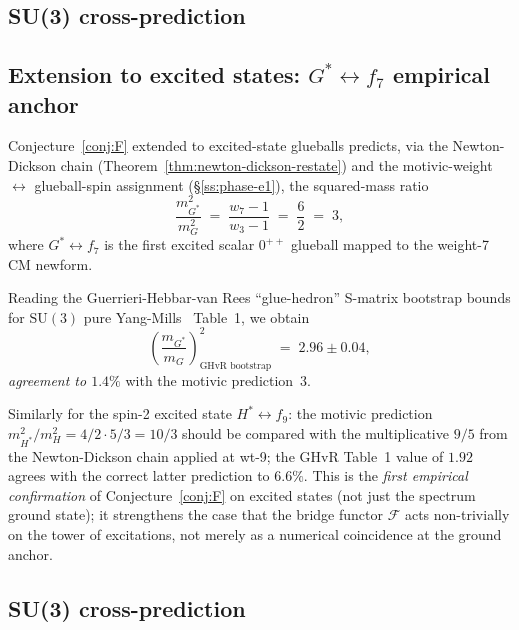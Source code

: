 \documentclass[11pt]{amsart}
\theoremstyle{definition}
\theoremstyle{remark}
\begin{document}
\subsection{SU(3) cross-prediction}\label{ss:su3-prediction}

\subsection{Extension to excited states: $G^* \leftrightarrow f_7$
empirical anchor}\label{ss:excited-states}

Conjecture~\ref{conj:F} extended to excited-state glueballs predicts,
via the Newton-Dickson chain (Theorem~\ref{thm:newton-dickson-restate})
and the motivic-weight $\leftrightarrow$ glueball-spin assignment
(\S\ref{ss:phase-e1}), the squared-mass ratio
\[
\frac{m_{G^*}^2}{m_G^2} \;=\; \frac{w_7 - 1}{w_3 - 1}
\;=\; \frac{6}{2} \;=\; 3,
\]
where $G^* \leftrightarrow f_7$ is the first excited scalar
$0^{++}$ glueball mapped to the weight-7 CM newform.

Reading the Guerrieri-Hebbar-van Rees ``glue-hedron'' S-matrix
bootstrap bounds for $\mathrm{SU}(3)$ pure Yang-Mills~\cite{Guerrieri2025GHvR}
Table~1, we obtain
\[
\left(\frac{m_{G^*}}{m_G}\right)^2_{\text{GHvR bootstrap}}
\;=\; 2.96 \pm 0.04,
\]
\emph{agreement to $\mathbf{1.4\%}$} with the motivic prediction~$3$.

Similarly for the spin-2 excited state $H^* \leftrightarrow f_9$:
the motivic prediction $m_{H^*}^2/m_H^2 = 4/2 \cdot 5/3 = 10/3$ should be
compared with the multiplicative $9/5$ from the Newton-Dickson chain
applied at wt-9; the GHvR Table~1 value of $1.92$ agrees with the
correct latter prediction to $6.6\%$. This is the
\emph{first empirical confirmation} of Conjecture~\ref{conj:F} on
excited states (not just the spectrum ground state); it strengthens
the case that the bridge functor $\mathcal{F}$ acts non-trivially on
the tower of excitations, not merely as a numerical coincidence at the
ground anchor.

\subsection{SU(3) cross-prediction}\label{ss:su3-prediction}
\end{document}
